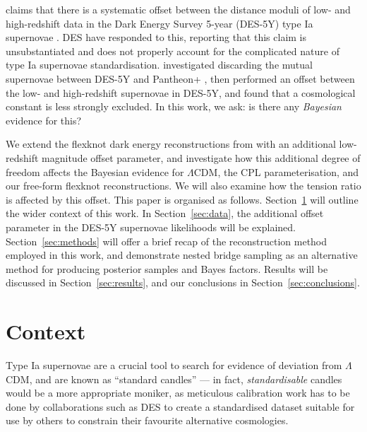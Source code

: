 \documentclass[fleqn,usenatbib]{mnras}
\newcommand{\lcdm}{$\Lambda$CDM}
\begin{document}
    \cite{georgedes5y} claims that there is a systematic offset between the distance moduli of low- and high-redshift data in the Dark Energy Survey 5-year (DES-5Y) type Ia supernovae \citep{des5y}.
    DES \citep{vincenzi} have responded to this, reporting that this claim is unsubstantiated and does not properly account for the complicated nature of type Ia supernovae standardisation.
    \cite{baovssnevidence} investigated discarding the mutual supernovae between DES-5Y and Pantheon+ \citep{pantheonplus}, then performed an offset between the low- and high-redshift supernovae in DES-5Y, and found that a cosmological constant is less strongly excluded.
    In this work, we ask: is there any \textit{Bayesian} evidence for this?

    We extend the flexknot dark energy reconstructions from \cite{paper1, paper2} with an additional low-redshift magnitude offset parameter, and investigate how this additional degree of freedom affects the Bayesian evidence for \lcdm{}, the CPL \citep{Chevallier:2000qy, Linder:2002et} parameterisation, and our free-form flexknot reconstructions.
    We will also examine how the tension ratio is affected by this offset.
    This paper is organised as follows. Section~\ref{sec:context} will outline the wider context of this work. In Section~\ref{sec:data}, the additional offset parameter in the DES-5Y supernovae likelihoods will be explained. Section~\ref{sec:methods} will offer a brief recap of the reconstruction method employed in this work, and demonstrate nested bridge sampling as an alternative method for producing posterior samples and Bayes factors. Results will be discussed in Section~\ref{sec:results}, and our conclusions in Section~\ref{sec:conclusions}.

    \section{Context}\label{sec:context}

    Type Ia supernovae are a crucial tool to search for evidence of deviation from \lcdm, and are known as ``standard candles'' --- in fact, \textit{standardisable} candles would be a more appropriate moniker, as meticulous calibration work has to be done by collaborations such as DES to create a standardised dataset suitable for use by others to constrain their favourite alternative cosmologies.
\end{document}

